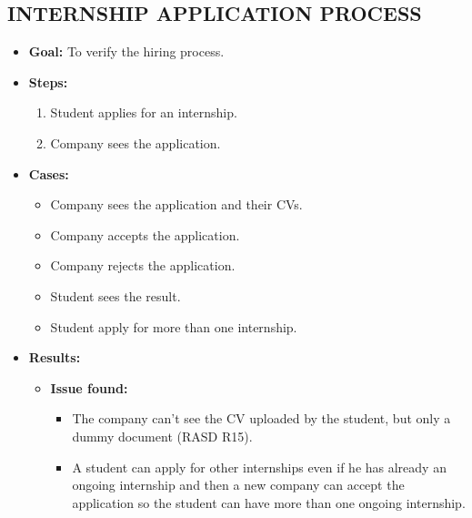 \subsection{INTERNSHIP APPLICATION PROCESS}\label{subsec:internship-application-process}
\begin{itemize}
    \item \textbf{Goal:} To verify the hiring process.

    \item \textbf{Steps:}
    \begin{enumerate}
        \item Student applies for an internship.
        \item Company sees the application.
    \end{enumerate}
    \item \textbf{Cases:}
    \begin{itemize}
        \item Company sees the application and their CVs.
        \item Company accepts the application.
        \item Company rejects the application.
        \item Student sees the result.
        \item Student apply for more than one internship.
    \end{itemize}
    \item \textbf{Results:}
    \begin{itemize}
        \item \textbf{Issue found:}
        \begin{itemize}
            \item The company can't see the CV uploaded by the student, but only a dummy document (RASD R15).
            \item A student can apply for other internships even if he has already an ongoing internship and then a new company can accept the application so the student can have more than one ongoing internship.
        \end{itemize}
    \end{itemize}
\end{itemize}

